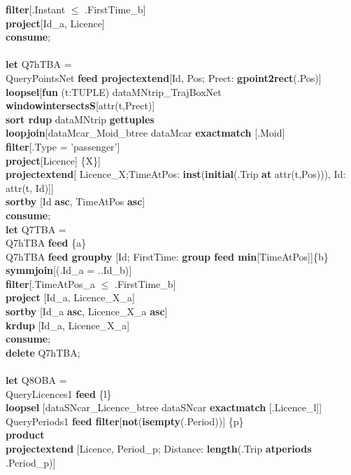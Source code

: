 \documentclass[a4paper]{article}
\newcommand{\op}[1]{\textbf{#1}}
\begin{document}
\begin{scriptsize}
\begin{tabbing}
\>\op{filter}[.Instant $\leq$ .FirstTime\_b]\\
\>\op{project}[Id\_a, Licence]\\
\op{consume};\\
\\
\op{let} Q7hTBA =\\
\>QueryPointsNet \op{feed projectextend}[Id, Pos; Prect: \op{gpoint2rect}(.Pos)]\\
\>\op{loopsel}[\op{fun} (t:TUPLE) dataMNtrip\_TrajBoxNet \op{windowintersectsS}[attr(t,Prect)]\\
\>\>\>\>\op{sort rdup} dataMNtrip \op{gettuples}\\
\>\>\op{loopjoin}[dataMcar\_Moid\_btree dataMcar \op{exactmatch} [.Moid]\\
\>\>\>\op{filter}[.Type = 'passenger']\\
\>\>\>\op{project}[Licence] \{X\}]\\
\>\>\op{projectextend}[ Licence\_X;TimeAtPos: \op{inst}(\op{initial}(.Trip \op{at} attr(t,Pos))), Id: attr(t, Id)]]\\
\>\op{sortby} [Id \op{asc}, TimeAtPos \op{asc}]\\
\op{consume};\\
\op{let} Q7TBA =\\
\>Q7hTBA \op{feed} \{a\}\\
\>Q7hTBA \op{feed groupby} [Id; FirstTime: \op{group feed min}[TimeAtPos]]\{b\}\\
\>\op{symmjoin}[(.Id\_a = ..Id\_b)]\\
\>\op{filter}[.TimeAtPos\_a $\leq$ .FirstTime\_b]\\
\>\op{project} [Id\_a, Licence\_X\_a]\\
\>\op{sortby} [Id\_a \op{asc}, Licence\_X\_a \op{asc}]\\
\>\op{krdup} [Id\_a, Licence\_X\_a]\\
\op{consume};\\
\op{delete} Q7hTBA;\\
\\
\op{let} Q8OBA =\\
\>QueryLicences1 \op{feed} \{l\}\\
\>\>\op{loopsel} [dataSNcar\_Licence\_btree dataSNcar \op{exactmatch}
[.Licence\_l]]\\
\>QueryPeriods1 \op{feed filter}[\op{not}(\op{isempty}(.Period))] \{p\}\\
\>\op{product}\\
\>\op{projectextend} [Licence, Period\_p; Distance: \op{length}(.Trip
\op{atperiods} .Period\_p)]\\

\end{tabbing}
\end{scriptsize}
\end{document}
